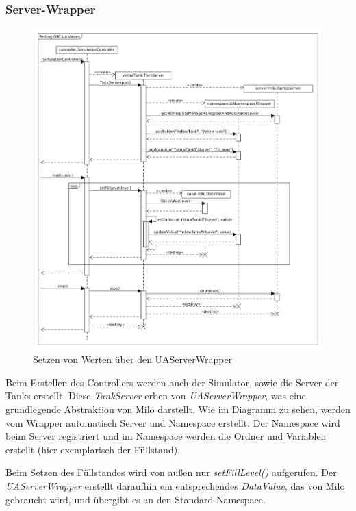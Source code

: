 \documentclass[parskip=full]{scrartcl}
\begin{document}
\subsubsection{Server-Wrapper}
\begin{figure}[H]
  \centering
  \includegraphics[scale=0.38]{design/sequence-diagrams/sequence-set-server-value.png}
  \caption{Setzen von Werten über den UAServerWrapper}
\end{figure}
Beim Erstellen des Controllers werden auch der Simulator, sowie die Server der Tanks erstellt.
Diese \emph{TankServer} erben von \emph{UAServerWrapper}, was eine grundlegende Abstraktion von Milo darstellt.
Wie im Diagramm zu sehen, werden vom Wrapper automatisch Server und Namespace erstellt. Der Namespace wird beim Server
registriert und im Namespace werden die Ordner und Variablen erstellt (hier exemplarisch der Füllstand).

Beim Setzen des Füllstandes wird von außen nur \emph{setFillLevel()} aufgerufen. Der \emph{UAServerWrapper} erstellt daraufhin
ein entsprechendes \emph{DataValue}, das von Milo gebraucht wird, und übergibt es an den Standard-Namespace.
\end{document}
